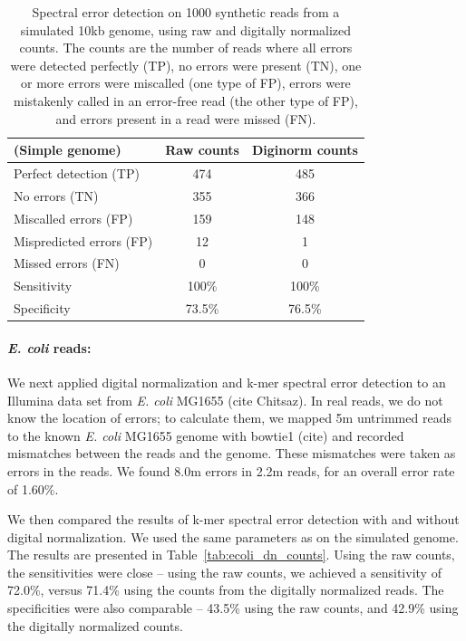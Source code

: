 \documentclass{article}
\begin{document}

\begin{table}
\begin{tabular}{|l|c|c|}
\hline
(Simple genome) & Raw counts & Diginorm counts \\
\hline
Perfect detection (TP) & 474 & 485 \\
No errors (TN) & 355 & 366 \\
Miscalled errors (FP) & 159 & 148 \\
Mispredicted errors (FP) & 12 & 1 \\
Missed errors (FN) & 0 & 0 \\
\hline
Sensitivity & 100\% & 100\% \\
Specificity & 73.5\% & 76.5\% \\
\hline
\end{tabular}
\label{tab:a}

\caption{Spectral error detection on 1000 synthetic reads from a
  simulated 10kb genome, using raw and digitally normalized
  counts.  The counts are the number of reads where all errors were
  detected perfectly (TP), no errors were present (TN), one or more errors were miscalled (one type of FP), errors were mistakenly called in an error-free read (the other type of FP), and errors present in a read were missed (FN). }
\end{table}


\paragraph{{\em E. coli} reads:}
We next applied digital normalization and k-mer spectral error
detection to an Illumina data set from {\em E. coli} MG1655 (cite
Chitsaz).  In real reads, we do not know the location of errors; to
calculate them, we mapped 5m untrimmed reads to the known {\em
  E. coli} MG1655 genome with bowtie1 (cite) and recorded mismatches
between the reads and the genome.  These mismatches were taken as
errors in the reads.  We found 8.0m errors in 2.2m reads, for an
overall error rate of 1.60\%.

We then compared the results of k-mer spectral error detection with
and without digital normalization.  We used the same parameters as on
the simulated genome.  The results are presented in
Table~\ref{tab:ecoli_dn_counts}. Using the raw counts, the
sensitivities were close -- using the raw counts, we achieved a
sensitivity of 72.0\%, versus 71.4\% using the counts from the
digitally normalized reads.  The specificities were also comparable --
43.5\% using the raw counts, and 42.9\% using the digitally normalized
counts.
\end{document}
